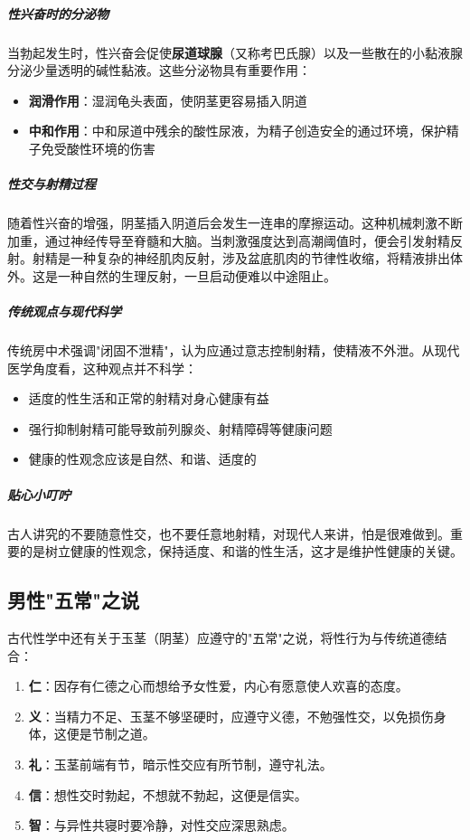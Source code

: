 \subparagraph{性兴奋时的分泌物}

当勃起发生时，性兴奋会促使\textbf{尿道球腺}（又称考巴氏腺）以及一些散在的小黏液腺分泌少量透明的碱性黏液。这些分泌物具有重要作用：
\begin{itemize}
    \item \textbf{润滑作用}：湿润龟头表面，使阴茎更容易插入阴道
    \item \textbf{中和作用}：中和尿道中残余的酸性尿液，为精子创造安全的通过环境，保护精子免受酸性环境的伤害
\end{itemize}

\subparagraph{性交与射精过程}

随着性兴奋的增强，阴茎插入阴道后会发生一连串的摩擦运动。这种机械刺激不断加重，通过神经传导至脊髓和大脑。当刺激强度达到高潮阈值时，便会引发射精反射。射精是一种复杂的神经肌肉反射，涉及盆底肌肉的节律性收缩，将精液排出体外。这是一种自然的生理反射，一旦启动便难以中途阻止。

\subparagraph{传统观点与现代科学}

传统房中术强调"闭固不泄精"，认为应通过意志控制射精，使精液不外泄。从现代医学角度看，这种观点并不科学：
\begin{itemize}
    \item 适度的性生活和正常的射精对身心健康有益
    \item 强行抑制射精可能导致前列腺炎、射精障碍等健康问题
    \item 健康的性观念应该是自然、和谐、适度的
\end{itemize}

\subparagraph{贴心小叮咛}

古人讲究的不要随意性交，也不要任意地射精，对现代人来讲，怕是很难做到。重要的是树立健康的性观念，保持适度、和谐的性生活，这才是维护性健康的关键。

\subsection{男性"五常"之说}

古代性学中还有关于玉茎（阴茎）应遵守的"五常"之说，将性行为与传统道德结合：

\begin{enumerate}
    \item \textbf{仁}：因存有仁德之心而想给予女性爱，内心有愿意使人欢喜的态度。
    \item \textbf{义}：当精力不足、玉茎不够坚硬时，应遵守义德，不勉强性交，以免损伤身体，这便是节制之道。
    \item \textbf{礼}：玉茎前端有节，暗示性交应有所节制，遵守礼法。
    \item \textbf{信}：想性交时勃起，不想就不勃起，这便是信实。
    \item \textbf{智}：与异性共寝时要冷静，对性交应深思熟虑。
\end{enumerate}

